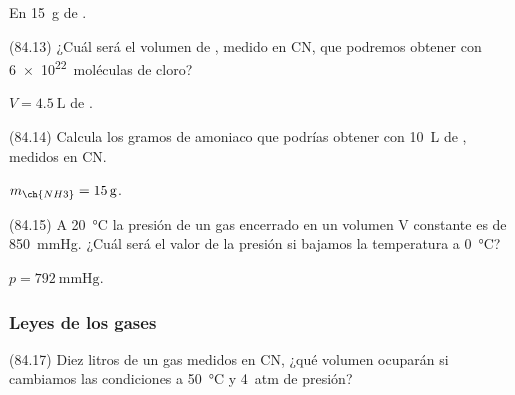       \begin{solution}
        En \SI{15}{g} de .
      \end{solution}




      \begin{exercise}[
          tags    = {},
          topics  = {química,química básica},
          source  = {FQ 1B MGH 2016, p84, e13},
        ]
        (84.13) ¿Cuál será el volumen de , medido en CN, que podremos
        obtener con \SI{6e22}{moléculas} de cloro?
      \end{exercise}

      \begin{solution}
        \( V = \SI{4.5}{\liter} \) de .
      \end{solution}




      \begin{exercise}[
          tags    = {},
          topics  = {química,química básica},
          source  = {FQ 1B MGH 2016, p84, e14},
        ]
        (84.14) Calcula los gramos de amoniaco que podrías obtener con \SI{10}{\liter}
        de , medidos en CN.
      \end{exercise}

      \begin{solution}
        \( m_{\ch{NH3}} = \SI{15}{g} \).
      \end{solution}




      \begin{exercise}[
          tags    = {},
          topics  = {química,química básica},
          source  = {FQ 1B MGH 2016, p84, e15},
        ]
        (84.15) A \SI{20}{\celsius} la presión de un gas encerrado en un volumen V constante es de \SI{850}{\mmHg}. ¿Cuál será el valor de la presión si bajamos la temperatura a \SI{0}{\celsius}?
      \end{exercise}

      \begin{solution}
        \( p = \SI{792}{\mmHg} \).
      \end{solution}



    \subsubsection*{Leyes de los gases}

      \begin{exercise}[
          tags    = {},
          topics  = {química,química básica},
          source  = {FQ 1B MGH 2016, p84, e17},
        ]
        (84.17) Diez litros de un gas medidos en CN, ¿qué volumen ocuparán
        si cambiamos las condiciones a \SI{50}{\celsius} y \SI{4}{atm} de presión?
      \end{exercise}

